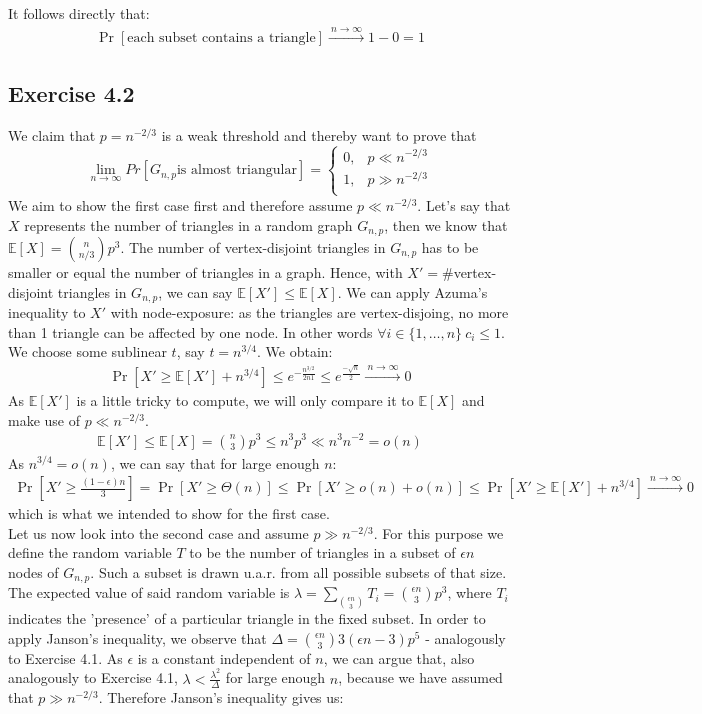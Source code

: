 \documentclass[a4paper,german]{article}
\newcommand{\E}{\mathbb{E}}
\begin{document}
It follows directly that:
\begin{align*}
\Pr[\text{each subset contains a triangle}] \xrightarrow{\: n \to \infty \: }  1 - 0 = 1
\end{align*}
\subsection*{Exercise 4.2}
We claim that \( p = n^{-2/3}\) is a weak threshold and thereby want to prove that
\[\lim_{n \to \infty} Pr [G_{n,p} \text{is almost triangular}] = 
 \begin{cases}
 	0, & p \ll n^{-2/3} \\
	1, & p \gg n^{-2/3} \\
    \end{cases}\]
We aim to show the first case first and therefore assume \( p \ll n^{-2/3}\). Let's say that \(X\) represents the number of triangles in a random graph \(G_{n,p}\), then we know that \( \E [X] = {n \choose n/3} p^3\). The number of vertex-disjoint triangles in \(G_{n,p}\) has to be smaller or equal the number of triangles in a graph. Hence, with \(X' = \# \)vertex-disjoint triangles in \(G_{n,p}\), we can say \(\E[X'] \leq \E[X]\). We can apply Azuma's inequality to \(X'\) with node-exposure: as the triangles are vertex-disjoing, no more than 1 triangle can be affected by one node. In other words \(\forall i \in \{1, \dots, n\}\ c_i \leq 1 \). We choose some sublinear \(t\), say \( t = n^{3/4}\). We obtain:
\begin{align*}
\Pr[X' \geq \E [X'] + n^{3/4}] \leq e^{-\frac{n^{3/2}}{2n1}} \leq e^{\frac{-\sqrt n}{2}}  \xrightarrow{\: n \to \infty \: }  0
\end{align*}
As \(\E[X']\) is a little tricky to compute, we will only compare it to \(\E[X]\) and make use of  \(p \ll n^{-2/3}\).
\begin{align*}
\E[X'] \leq \E[X] = {n \choose 3}p^3 \leq n^3p^3  \ll n^3n^{-2} = o(n)
\end{align*}
As \(n^{3/4} = o(n)\), we can say that for large enough \(n\):
\begin{align*}
\Pr[X' \geq \frac{(1-\epsilon)n}{3}] = \Pr[X' \geq \Theta(n)] \leq \Pr[X' \geq o(n) + o(n)] \leq  \Pr[X' \geq \E [X'] + n^{3/4}]  \xrightarrow{\: n \to \infty \: }  0
\end{align*}
which is what we intended to show for the first case. \\
Let us now look into the second case and assume \( p \gg n^{-2/3}\). For this purpose we define the random variable \(T\) to be the number of triangles in a subset of \(\epsilon n\) nodes of \(G_{n,p}\). Such a subset is drawn u.a.r. from all possible subsets of that size. The expected value of said random variable is \(\lambda = \sum_{\epsilon n \choose  3} T_i = {\epsilon n \choose  3} p^3 \), where \(T_i\) indicates the 'presence' of a particular triangle in the fixed subset. In order to apply Janson's inequality, we observe that \(\Delta = {\epsilon n \choose 3} 3 (\epsilon n -3) p^5 \) - analogously to Exercise 4.1. As \(\epsilon\) is a constant independent of \(n\), we can argue that, also analogously to Exercise 4.1, \(\lambda < \frac{\lambda^2}{\Delta} \) for large enough \(n\), because we have assumed that \( p \gg n^{-2/3}\). Therefore Janson's inequality gives us:
\end{document}
